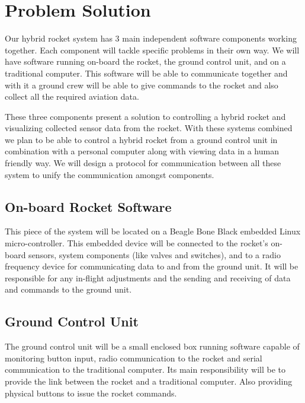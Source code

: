 \documentclass[10pt,draftclsnofoot,onecolumn]{IEEEtran}
\begin{document}
\section{Problem Solution}
Our hybrid rocket system has 3 main independent software components working together. Each component will tackle specific problems in their own way. We will have software running on-board the rocket, the ground control unit, and on a traditional computer. This software will be able to communicate together and with it a ground crew will be able to give commands to the rocket and also collect all the required aviation data.\par
These three components present a solution to controlling a hybrid rocket and visualizing collected sensor data from the rocket. With these systems combined we plan to be able to control a hybrid rocket from a ground control unit in combination with a personal computer along with viewing data in a human friendly way. We will design a protocol for communication between all these system to unify the communication amongst components.

\subsection{On-board Rocket Software}
This piece of the system will be located on a Beagle Bone Black embedded Linux micro-controller. This embedded device will be connected to the rocket's on-board sensors, system components (like valves and switches), and to a radio frequency device for communicating data to and from the ground unit. It will be responsible for any in-flight adjustments and the sending and receiving of data and commands to the ground unit.

\subsection{Ground Control Unit}
The ground control unit will be a small enclosed box running software capable of monitoring button input, radio communication to the rocket and serial communication to the traditional computer. Its main responsibility will be to provide the link between the rocket and a traditional computer. Also providing physical buttons to issue the rocket commands. 
\end{document}

